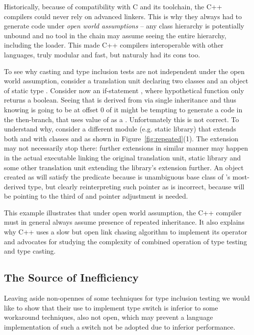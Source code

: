 Historically, because of compatibility with C and its toolchain, the C++ 
compilers could never rely on advanced linkers. This is why they always had to 
generate code under \emph{open world assumptions} -- any class hierarchy is 
potentially unbound and no tool in the chain may assume seeing the entire 
hierarchy, including the loader. This made C++ compilers interoperable with 
other languages, truly modular and fast, but naturaly had its cons too.

To see why casting and type inclusion tests are not independent under the open 
world assumption, consider a translation unit declaring two classes  
and an object  of static type . Consider now an if-statement
, where hypothetical  function only 
returns a boolean. Seeing that  is derived from  via single 
inheritance and thus knowing  is going to be at offset 0 of  it 
might be tempting to generate a code in the then-branch, that uses value of 
 as a . Unfortunately this is not correct. To understand why, 
consider a different module (e.g. static library) that extends both  and 
 with classes  and  as shown in 
Figure~\ref{fig:repeated}(1). The extension may not necessarily stop there: further 
extensions in similar manner may happen in the actual executable linking the 
original translation unit, static library and some other translation unit 
extending the library's extension further. An object created as 
 will satisfy the predicate  
because  is unambiguous base class of 's most-derived type, but 
clearly reinterpreting such pointer as  is incorrect, because  will 
be pointing to the third  of  and pointer adjustment is needed.

This example illustrates that under open world assumption, the C++ compiler must 
in general always assume presence of repeated inheritance. It also explains why 
C++ uses a slow but open link chasing algorithm to implement its 
 operator and advocates for studying the complexity of 
combined operation of type testing and type casting. 

\subsection{The Source of Inefficiency}

Leaving aside non-opennes of some techniques for type inclusion testing we would 
like to show that their use to implement type switch is inferior to some 
workaround techniques, also not open, which may prevent a language 
implementation of such a switch not be adopted due to inferior performance.

